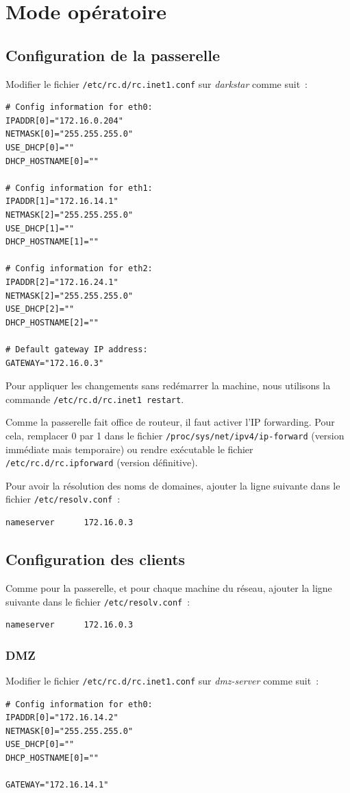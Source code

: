 \documentclass[11pt,a4paper,oneside]{article}
\begin{document}
\section{Mode opératoire}

\subsection{Configuration de la passerelle}
Modifier le fichier \verb#/etc/rc.d/rc.inet1.conf# sur \emph{darkstar} comme
suit~:
\begin{verbatim}
# Config information for eth0:
IPADDR[0]="172.16.0.204"
NETMASK[0]="255.255.255.0"
USE_DHCP[0]=""
DHCP_HOSTNAME[0]=""

# Config information for eth1:
IPADDR[1]="172.16.14.1"
NETMASK[2]="255.255.255.0"
USE_DHCP[1]=""
DHCP_HOSTNAME[1]=""

# Config information for eth2:
IPADDR[2]="172.16.24.1"
NETMASK[2]="255.255.255.0"
USE_DHCP[2]=""
DHCP_HOSTNAME[2]=""

# Default gateway IP address:
GATEWAY="172.16.0.3"
\end{verbatim}

Pour appliquer les changements sans redémarrer la machine, nous utilisons la
commande \verb#/etc/rc.d/rc.inet1 restart#.

Comme la passerelle fait office de routeur, il faut activer l'IP forwarding.
Pour cela, remplacer 0 par 1 dans le fichier
\verb#/proc/sys/net/ipv4/ip-forward# (version immédiate mais temporaire) ou
rendre exécutable le fichier \verb#/etc/rc.d/rc.ipforward# (version
définitive).

Pour avoir la résolution des noms de domaines, ajouter la ligne suivante dans le
fichier \verb#/etc/resolv.conf#~:
\begin{verbatim}
nameserver      172.16.0.3
\end{verbatim}

\subsection{Configuration des clients}

Comme pour la passerelle, et pour chaque machine du réseau, ajouter la ligne
suivante dans le fichier \verb#/etc/resolv.conf#~:
\begin{verbatim}
nameserver      172.16.0.3
\end{verbatim}


\subsubsection{DMZ}
Modifier le fichier \verb#/etc/rc.d/rc.inet1.conf# sur \emph{dmz-server} comme
suit~:
\begin{verbatim}
# Config information for eth0:
IPADDR[0]="172.16.14.2"
NETMASK[0]="255.255.255.0"
USE_DHCP[0]=""
DHCP_HOSTNAME[0]=""

GATEWAY="172.16.14.1"
\end{verbatim}
\end{document}
